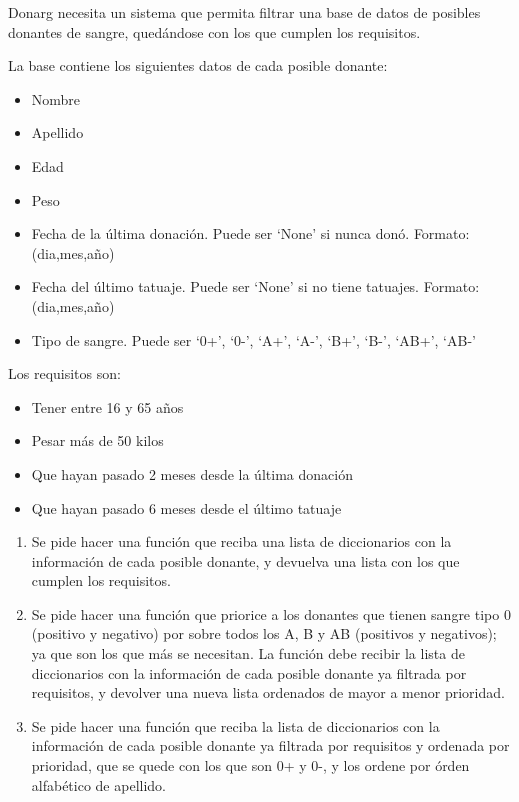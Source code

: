 \documentclass[
  letterpaper,
  DIV=11,
  numbers=noendperiod]{scrreprt}
\providecommand{\tightlist}{%
  \setlength{\itemsep}{0pt}\setlength{\parskip}{0pt}}\usepackage{longtable,booktabs,array}
\begin{document}
\begin{enumerate}
  Donarg necesita un sistema que permita filtrar una base de datos de
  posibles donantes de sangre, quedándose con los que cumplen los
  requisitos.

  La base contiene los siguientes datos de cada posible donante:

  \begin{itemize}
  \tightlist
  \item
    Nombre
  \item
    Apellido
  \item
    Edad
  \item
    Peso
  \item
    Fecha de la última donación. Puede ser `None' si nunca donó.
    Formato: (dia,mes,año)
  \item
    Fecha del último tatuaje. Puede ser `None' si no tiene tatuajes.
    Formato: (dia,mes,año)
  \item
    Tipo de sangre. Puede ser `0+', `0-', `A+', `A-', `B+', `B-', `AB+',
    `AB-'
  \end{itemize}

  Los requisitos son:

  \begin{itemize}
  \tightlist
  \item
    Tener entre 16 y 65 años
  \item
    Pesar más de 50 kilos
  \item
    Que hayan pasado 2 meses desde la última donación
  \item
    Que hayan pasado 6 meses desde el último tatuaje
  \end{itemize}

  \begin{enumerate}
  \def\labelenumii{\alph{enumii}.}
  \item
    Se pide hacer una función que reciba una lista de diccionarios con
    la información de cada posible donante, y devuelva una lista con los
    que cumplen los requisitos.
  \item
    Se pide hacer una función que priorice a los donantes que tienen
    sangre tipo 0 (positivo y negativo) por sobre todos los A, B y AB
    (positivos y negativos); ya que son los que más se necesitan. La
    función debe recibir la lista de diccionarios con la información de
    cada posible donante ya filtrada por requisitos, y devolver una
    nueva lista ordenados de mayor a menor prioridad.
  \item
    Se pide hacer una función que reciba la lista de diccionarios con la
    información de cada posible donante ya filtrada por requisitos y
    ordenada por prioridad, que se quede con los que son 0+ y 0-, y los
    ordene por órden alfabético de apellido.
  \end{enumerate}


\end{enumerate}
\end{document}
